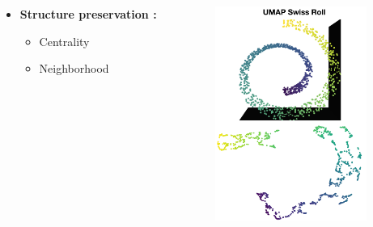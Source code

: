 \documentclass[compress]{beamer}
\begin{document}
\begin{frame}
\vspace*{-1cm}
    \begin{overprint}
\begin{columns}[c]
  \begin{column}{0.55\linewidth}
 \begin{itemize}
     \item \textbf{Structure preservation : }\\
     \begin{itemize}
         \item Centrality 
         \item Neighborhood
     \end{itemize}
 \end{itemize}
  \end{column}

  \begin{column}{0.45\linewidth}
       \begin{figure}
\centering
\includegraphics[height=7cm]{figures/methods/swiss_roll.pdf}
  \end{figure}
  \end{column}
 \end{columns} 
 

\end{overprint}
\end{frame}
\end{document}

